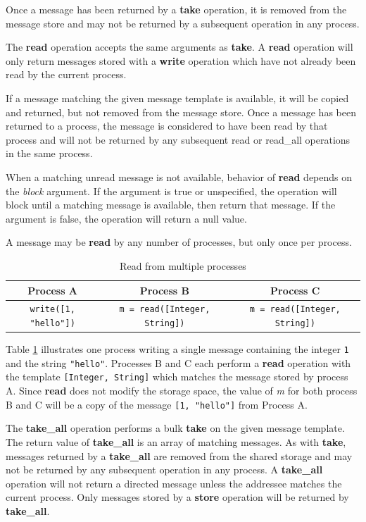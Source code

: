 \documentclass[lnicst]{svmultln}
\begin{document}
Once a message has been returned by a \textbf{take} operation, it is removed from the message store and may not be returned by a subsequent operation in any process.

The \textbf{read} operation accepts the same arguments as \textbf{take}. A \textbf{read} operation will only return messages stored with a \textbf{write} operation which have not already been read by the current process.

If a message matching the given message template is available, it will be copied and returned, but not removed from the message store. Once a message has been returned to a process, the message is considered to have been read by that process and will not be returned by any subsequent read or read\_all operations in the same process.

When a matching unread message is not available, behavior of \textbf{read} depends on the \textit{block} argument. If the argument is true or unspecified, the operation will block until a matching message is available, then return that message. If the argument is false, the operation will return a null value.

A message may be \textbf{read} by any number of processes, but only once per process.

\begin{table}
\centering
\caption{Read from multiple processes}
\begin{tabular}{|c|c|c|} \hline
\textbf{Process A} & \textbf{Process B} & \textbf{Process C} \\ \hline
\texttt{write([1, "hello"])} & \texttt{m = read([Integer, String])} & \texttt{m = read([Integer, String])} \\ \hline
\end{tabular}
\label{fig:readprocesses}
\end{table}

Table \ref{fig:readprocesses} illustrates one process writing a single message containing the integer \texttt{1} and the string \texttt{"hello"}. Processes B and C each perform a \textbf{read} operation with the template \texttt{[Integer, String]} which matches the message stored by process A. Since \textbf{read} does not modify the storage space, the value of \textit{m} for both process B and C will be a copy of the message \texttt{[1, "hello"]} from Process A.

The \textbf{take\_all} operation performs a bulk \textbf{take} on the given message template. The return value of \textbf{take\_all} is an array of matching messages. As with \textbf{take}, messages returned by a \textbf{take\_all} are removed from the shared storage and may not be returned by any subsequent operation in any process. A \textbf{take\_all} operation will not return a directed message unless the addressee matches the current process. Only messages stored by a \textbf{store} operation will be returned by \textbf{take\_all}.
\end{document}
